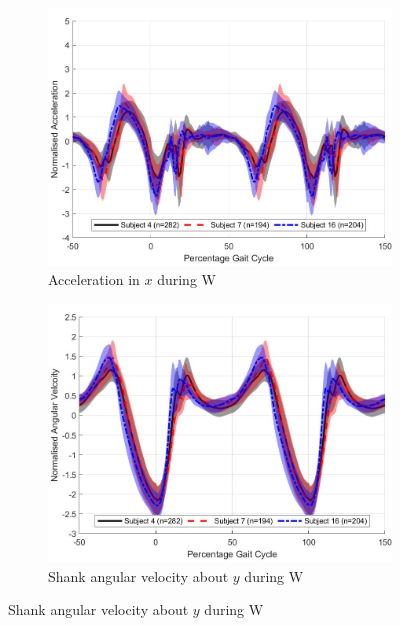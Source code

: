 \begin{figure}[!hbtp]
     \centering
     \begin{subfigure}[H]{0.45\textwidth}
    \centering
         \includegraphics[width=\textwidth]{content/4-LSTM_Behaviour/inter_subject_trends/accel_x_trend_Walking.jpg}
         \caption{Acceleration in $x$ during W}
         \label{subfig:x_accel_w}
     \end{subfigure}
     \begin{subfigure}[H]{0.45\textwidth}
    \centering
         \includegraphics[width=\textwidth]{content/4-LSTM_Behaviour/inter_subject_trends/gyro_y_trend_Walking.jpg}
         \caption{Shank angular velocity about $y$ during W}
         \label{subfig:y_gyro_w}

\end{subfigure}
\end{figure}
